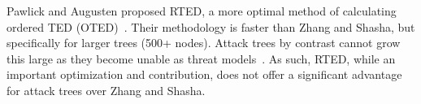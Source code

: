 Pawlick and Augusten proposed RTED, a more optimal method of calculating ordered TED (OTED)~\cite{pawlik_rted_2011}. Their methodology is faster than Zhang and Shasha, but specifically for larger trees (500+ nodes). Attack trees by contrast cannot grow this large as they become unable as threat models~\cite{andersonSecurityEngineeringGuide2020}. As such, RTED, while an important optimization and contribution, does not offer a significant advantage for attack trees over Zhang and Shasha.










